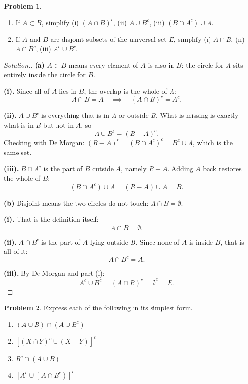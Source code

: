 \documentclass[11pt,a4paper]{article}
\theoremstyle{definition}
\newtheorem{problemx}{Problem}[section]
\newenvironment{problem}{\begin{problemx}}{\end{problemx}}
\newenvironment{solution}
  {\renewcommand{\qedsymbol}{}\begin{proof}[\textit{Solution}.]}
  {\end{proof}}
\begin{document}
\begin{problem}
\begin{enumerate}
\item[(a).] If $A\subset B$, simplify \quad (i) $(A\cap B)^c$, \quad (ii) $A\cup B^c$,
\quad (iii) $\left(B\cap A^c\right)\cup A$.
\item[(b).] If $A$ and $B$ are disjoint subsets of the universal set $E$, simplify
\quad (i) $A\cap B$, \quad (ii) $A\cap B^c$, \quad (iii) $A^c\cup B^c$.
\end{enumerate}
\end{problem}

\begin{solution}
\textbf{(a)} $A\subset B$ means every element of $A$ is also in $B$: the circle for $A$
sits entirely inside the circle for $B$.

\textbf{(i).} Since all of $A$ lies in $B$, the overlap is the whole of $A$:
$$A\cap B=A\quad\implies\quad (A\cap B)^c=A^c.$$

\textbf{(ii).} $A\cup B^c$ is everything that is in $A$ or outside $B$. What is missing
is exactly what is in $B$ but not in $A$, so
$$A\cup B^c=(B-A)^c.$$
Checking with De Morgan: $(B-A)^c=\left(B\cap A^c\right)^c=B^c\cup A$, which is the same
set.

\textbf{(iii).} $B\cap A^c$ is the part of $B$ outside $A$, namely $B-A$. Adding $A$
back restores the whole of $B$:
$$\left(B\cap A^c\right)\cup A=(B-A)\cup A=B.$$

\textbf{(b)} Disjoint means the two circles do not touch: $A\cap B=\emptyset$.

\textbf{(i).} That is the definition itself:
$$A\cap B=\emptyset.$$

\textbf{(ii).} $A\cap B^c$ is the part of $A$ lying outside $B$. Since none of $A$ is
inside $B$, that is all of it:
$$A\cap B^c=A.$$

\textbf{(iii).} By De Morgan and part (i):
$$A^c\cup B^c=(A\cap B)^c=\emptyset^c=E.$$
\end{solution}

\begin{problem}
Express each of the following in its simplest form.
\begin{enumerate}
\item[(i).] $(A\cup B)\cap\left(A\cup B^c\right)$
\item[(ii).] $\left[(X\cap Y)^c\cup(X-Y)\right]^c$
\item[(iii).] $B^c\cap(A\cup B)$
\item[(iv).] $\left[A^c\cup\left(A\cap B^c\right)\right]^c$
\end{enumerate}
\end{problem}
\end{document}
